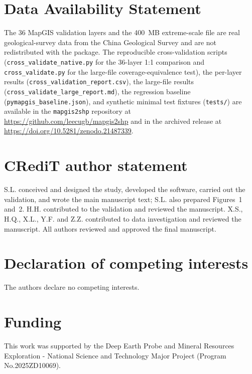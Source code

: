 \documentclass[11pt,a4paper]{article}
\begin{document}
\section*{Data Availability Statement}
The 36 MapGIS validation layers and the 400~MB extreme-scale file are real geological-survey data from the China Geological Survey and are not redistributed with the package. The reproducible cross-validation scripts (\texttt{cross\_validate\_native.py} for the 36-layer 1:1 comparison and \texttt{cross\_validate.py} for the large-file coverage-equivalence test), the per-layer results (\texttt{cross\_validation\_report.csv}), the large-file results (\texttt{cross\_validate\_large\_report.md}), the regression baseline (\texttt{pymapgis\_baseline.json}), and synthetic minimal test fixtures (\texttt{tests/}) are available in the \texttt{mapgis2shp} repository at \url{https://github.com/leecugb/mapgis2shp} and in the archived release at \url{https://doi.org/10.5281/zenodo.21487339}.

\section*{CRediT author statement}
S.L. conceived and designed the study, developed the software, carried out the validation, and wrote the main manuscript text; S.L. also prepared Figures~1 and~2. H.H. contributed to the validation and reviewed the manuscript. X.S., H.Q., X.L., Y.F. and Z.Z. contributed to data investigation and reviewed the manuscript. All authors reviewed and approved the final manuscript.

\section*{Declaration of competing interests}
The authors declare no competing interests.

\section*{Funding}
This work was supported by the Deep Earth Probe and Mineral Resources Exploration - National Science and Technology Major Project (Program No.2025ZD10069).
\end{document}
